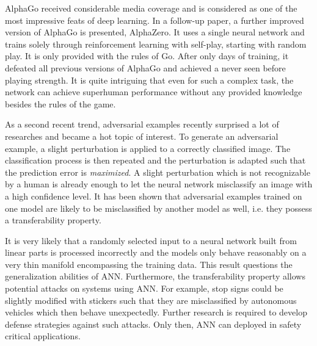 AlphaGo received considerable media coverage and is considered as one of the most impressive feats of deep learning. In a follow-up paper, a further improved version of AlphaGo is presented, AlphaZero\cite{silver2017mastering}. It uses a single neural network and trains solely through reinforcement learning with self-play, starting with random play. It is only provided with the rules of Go. After only days of training, it defeated all previous versions of AlphaGo and achieved a never seen before playing strength. It is quite intriguing that even for such a complex task, the network can achieve superhuman performance without any provided knowledge besides the rules of the game.

As a second recent trend, adversarial examples recently surprised a lot of researches and became a hot topic of interest. To generate an adversarial example, a slight perturbation is applied to a correctly classified image. The classification process is then repeated and the perturbation is adapted such that the prediction error is \textit{maximized}. A slight perturbation which is not recognizable by a human is already enough to let the neural network misclassify an image with a high confidence level\cite{Nguyen_2015_CVPR}. It has been shown that adversarial examples trained on one model are likely to be misclassified by another model as well, i.e. they possess a transferability property\cite{szegedy2013intriguing}.

It is very likely that a randomly selected input to a neural network built from linear parts is processed incorrectly and the models only behave reasonably on a very thin manifold encompassing the training data\cite{goodfellow2014explaining}. This result questions the generalization abilities of ANN. Furthermore, the transferability property allows potential attacks on systems using ANN\cite{kurakin2016adversarial}\cite{papernot2017practical}. For example, stop signs could be slightly modified with stickers such that they are misclassified by autonomous vehicles which then behave unexpectedly. Further research is required to develop defense strategies against such attacks. Only then, ANN can deployed in safety critical applications.
